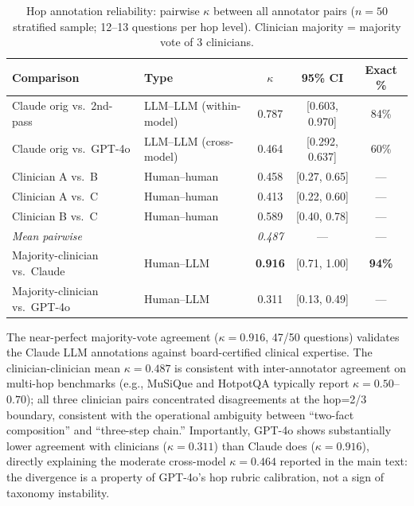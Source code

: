 \documentclass{article}
\begin{document}
\begin{table}[h]
\centering
\caption{Hop annotation reliability: pairwise $\kappa$ between all annotator pairs
($n = 50$ stratified sample; 12--13 questions per hop level).
Clinician majority = majority vote of 3 clinicians.}
\label{tab:hop_kappa_full}
\small
\begin{tabular}{llccc}
\toprule
\textbf{Comparison} & \textbf{Type} & \textbf{$\kappa$} & \textbf{95\% CI} & \textbf{Exact \%} \\
\midrule
Claude orig vs.\ 2nd-pass  & LLM–LLM (within-model) & 0.787 & [0.603, 0.970] & 84\% \\
Claude orig vs.\ GPT-4o    & LLM–LLM (cross-model)  & 0.464 & [0.292, 0.637] & 60\% \\
\midrule
Clinician A vs.\ B & Human–human & 0.458 & [0.27, 0.65] & --- \\
Clinician A vs.\ C & Human–human & 0.413 & [0.22, 0.60] & --- \\
Clinician B vs.\ C & Human–human & 0.589 & [0.40, 0.78] & --- \\
\textit{Mean pairwise} & & \textit{0.487} & --- & --- \\
\midrule
Majority-clinician vs.\ Claude & Human–LLM & \textbf{0.916} & [0.71, 1.00] & \textbf{94\%} \\
Majority-clinician vs.\ GPT-4o & Human–LLM & 0.311 & [0.13, 0.49] & --- \\
\bottomrule
\end{tabular}
\end{table}

The near-perfect majority-vote agreement ($\kappa = 0.916$, 47/50 questions)
validates the Claude LLM annotations against board-certified clinical expertise.
The clinician-clinician mean $\kappa = 0.487$ is consistent with inter-annotator
agreement on multi-hop benchmarks (e.g., MuSiQue and HotpotQA typically report
$\kappa = 0.50$--$0.70$); all three clinician pairs concentrated disagreements at
the hop=2/3 boundary, consistent with the operational ambiguity between
``two-fact composition'' and ``three-step chain.'' Importantly, GPT-4o shows
substantially lower agreement with clinicians ($\kappa = 0.311$) than Claude does
($\kappa = 0.916$), directly explaining the moderate cross-model $\kappa = 0.464$
reported in the main text: the divergence is a property of GPT-4o's hop rubric
calibration, not a sign of taxonomy instability.
\end{document}
